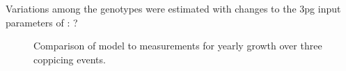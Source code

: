\documentclass[10pt]{article}
\begin{document}
Variations among the genotypes were estimated with changes to the \ac{3pg}
input parameters of : ?

\begin{table}[!ht]
  \centering
    
  \caption{\ac{3pg} parameter variations of \ac{3pg} among genotypes}
  \label{tab:afas-3pg}
\end{table}

\begin{figure}[!ht]
  \centering
  
  \caption{Comparison of model to measurements for yearly growth over three
    coppicing events.}
\label{fig:afas-biomass}
\end{figure}




\end{document}

